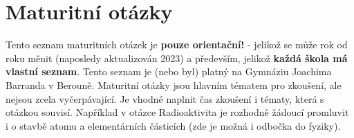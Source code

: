 \newenvironment{boldEnum}
  {\begin{enumerate}
   \let\olditem\item
   \long\def\item##1\\{\olditem{\bfseries ##1}\par}}
  {\end{enumerate}
}

\section{Maturitní otázky}
Tento seznam maturitních otázek je \textbf{pouze orientační!} - jelikož se může rok od roku měnit (naposledy aktualizován 2023) a především,
jelikož \textbf{každá škola má vlastní seznam}. Tento seznam je (nebo byl) platný na Gymnáziu Joachima Barranda v Berouně.
Maturitní otázky jsou hlavním tématem pro zkoušení, ale nejsou zcela vyčerpávající. Je vhodné naplnit čas zkoušení i tématy, která s otázkou souvisí.
Například v otázce Radioaktivita je rozhodně žádoucí promluvit i o stavbě atomu a elementárních částicích (zde je možná i odbočka do fyziky). 

